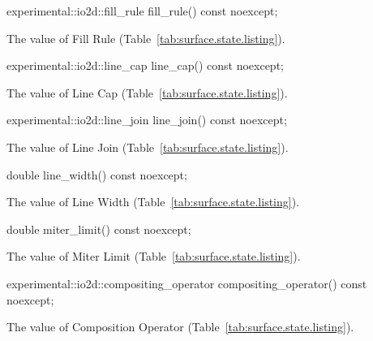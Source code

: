 \begin{itemdecl}
experimental::io2d::fill_rule fill_rule() const noexcept;
\end{itemdecl}
\begin{itemdescr}
\pnum
\returns
The value of Fill Rule (Table~\ref{tab:surface.state.listing}).
\end{itemdescr}

\begin{itemdecl}
experimental::io2d::line_cap line_cap() const noexcept;
\end{itemdecl}
\begin{itemdescr}
\pnum
\returns
The value of Line Cap (Table~\ref{tab:surface.state.listing}).
\end{itemdescr}

\begin{itemdecl}
experimental::io2d::line_join line_join() const noexcept;
\end{itemdecl}
\begin{itemdescr}
\pnum
\returns
The value of Line Join (Table~\ref{tab:surface.state.listing}).
\end{itemdescr}

\begin{itemdecl}
double line_width() const noexcept;
\end{itemdecl}
\begin{itemdescr}
\pnum
\returns
The value of Line Width (Table~\ref{tab:surface.state.listing}).
\end{itemdescr}

\begin{itemdecl}
double miter_limit() const noexcept;
\end{itemdecl}
\begin{itemdescr}
\pnum
\returns
The value of Miter Limit (Table~\ref{tab:surface.state.listing}).
\end{itemdescr}

\begin{itemdecl}
experimental::io2d::compositing_operator compositing_operator() const
  noexcept;
\end{itemdecl}
\begin{itemdescr}
\pnum
\returns
The value of Composition Operator (Table~\ref{tab:surface.state.listing}).
\end{itemdescr}

